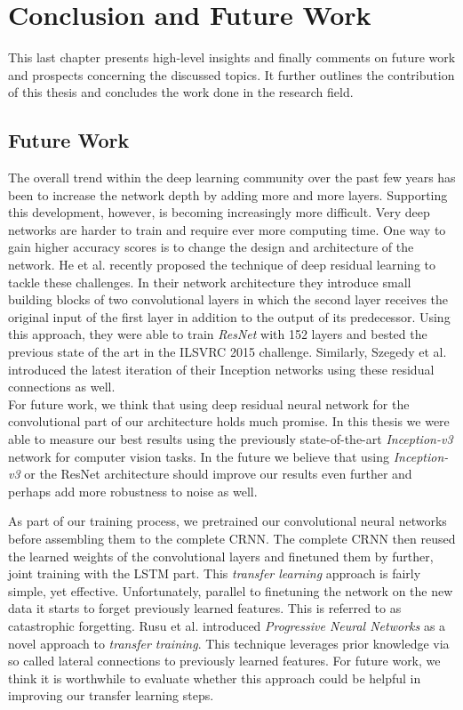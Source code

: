 \section{Conclusion and Future Work}
\label{sec:summary}
This last chapter presents high-level insights and finally comments on
future work and prospects concerning the discussed topics.
It further outlines the contribution of this thesis and concludes the work done
in the research field.

\subsection{Future Work}
The overall trend within the deep learning community over the past few years has been to increase the network depth by adding more and more layers. Supporting this development, however, is becoming increasingly more difficult. Very deep networks are harder to train and require ever more computing time. One way to gain higher accuracy scores is to change the design and architecture of the network. He et al. recently proposed the technique of deep residual learning\cite{he2016deep} to tackle these challenges. In their network architecture they introduce small building blocks of two convolutional layers in which the second layer receives the original input of the first layer in addition to the output of its predecessor. \cite{he2016deep} Using this approach, they were able to train \emph{ResNet} with 152 layers and bested the previous state of the art in the ILSVRC 2015 challenge. Similarly, Szegedy et al. introduced the latest iteration of their Inception networks using these residual connections\cite{szegedy2016inception} as well.\\
For future work, we think that using deep residual neural network for the convolutional part of our architecture holds much promise. In this thesis we were able to measure our best results using the previously state-of-the-art \emph{Inception-v3} network for computer vision tasks. In the future we believe that using \emph{Inception-v3} or the ResNet architecture should improve our results even further and perhaps add more robustness to noise as well.

As part of our training process, we pretrained our convolutional neural networks before assembling them to the complete CRNN. The complete CRNN then reused the learned weights of the convolutional layers and finetuned them by further, joint training with the LSTM part. This \emph{transfer learning} approach is fairly simple, yet effective. Unfortunately, parallel to finetuning the network on the new data it starts to forget previously learned features. This is referred to as catastrophic forgetting. Rusu et al. introduced \emph{Progressive Neural Networks}\cite{rusu2016progressive} as a novel approach to \emph{transfer training}. This technique leverages prior knowledge via so called lateral connections to previously learned features. For future work, we think it is worthwhile to evaluate whether this approach could be helpful in improving our transfer learning steps.

